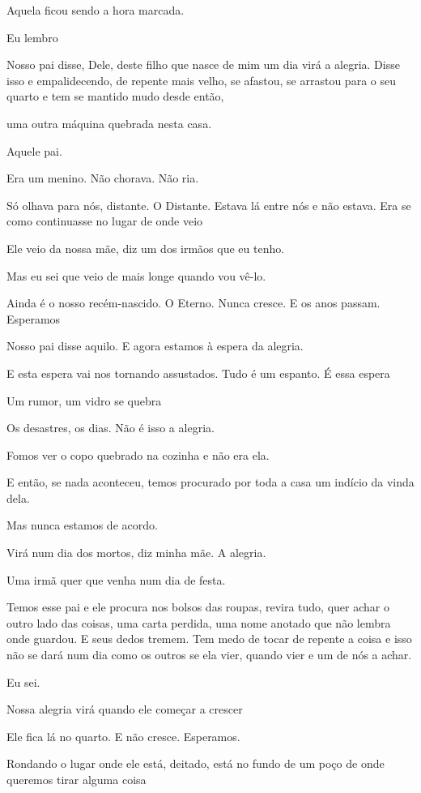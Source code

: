 Aquela ficou sendo a hora marcada.

Eu lembro

Nosso pai disse, Dele, deste filho que nasce de mim um dia virá a
alegria. Disse isso e empalidecendo, de repente mais velho, se afastou,
se arrastou para o seu quarto e tem se mantido mudo desde então,

uma outra máquina quebrada nesta casa.

Aquele pai.

Era um menino. Não chorava. Não ria.

Só olhava para nós, distante. O Distante. Estava lá entre nós e não
estava. Era se como continuasse no lugar de onde veio

Ele veio da nossa mãe, diz um dos irmãos que eu tenho.

Mas eu sei que veio de mais longe quando vou vê-lo.

Ainda é o nosso recém-nascido. O Eterno. Nunca cresce. E os anos passam.
Esperamos

Nosso pai disse aquilo. E agora estamos à espera da alegria.

E esta espera vai nos tornando assustados. Tudo é um espanto. É essa
espera

Um rumor, um vidro se quebra

Os desastres, os dias. Não é isso a alegria.

Fomos ver o copo quebrado na cozinha e não era ela.

E então, se nada aconteceu, temos procurado por toda a casa um indício
da vinda dela.

Mas nunca estamos de acordo.

Virá num dia dos mortos, diz minha mãe. A alegria.

Uma irmã quer que venha num dia de festa.

Temos esse pai e ele procura nos bolsos das roupas, revira tudo, quer
achar o outro lado das coisas, uma carta perdida, uma nome anotado que
não lembra onde guardou. E seus dedos tremem. Tem medo de tocar de
repente a coisa e isso não se dará num dia como os outros se ela vier,
quando vier e um de nós a achar.

Eu sei.

Nossa alegria virá quando ele começar a crescer

Ele fica lá no quarto. E não cresce. Esperamos.

Rondando o lugar onde ele está, deitado, está no fundo de um poço de
onde queremos tirar alguma coisa


